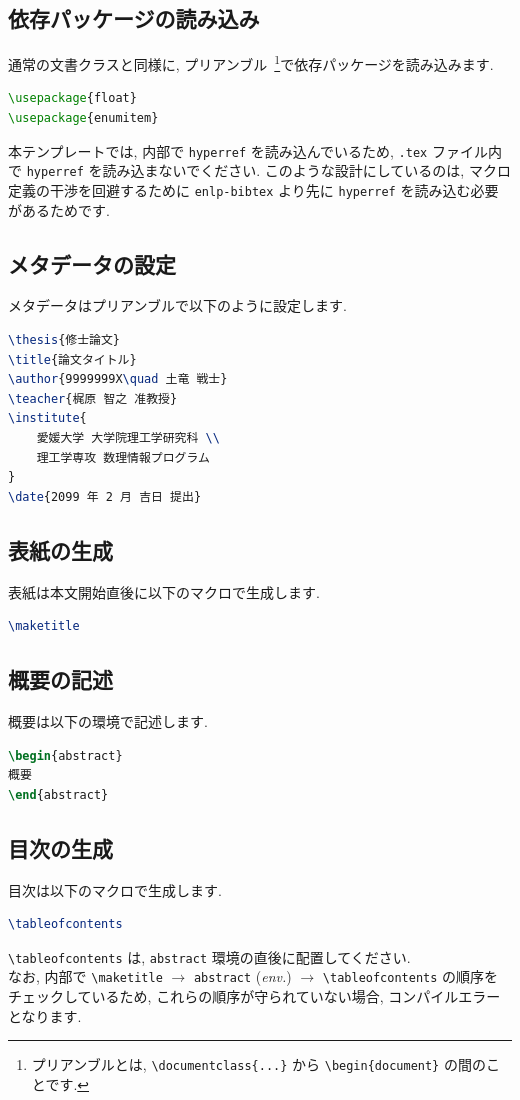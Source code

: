 \documentclass{ltjsarticle}
\newcommand{\pkg}[1]{\texttt{#1}}
\newcommand{\cs}[1]{\texttt{\textbackslash#1}}
\begin{document}
\subsection{依存パッケージの読み込み}
通常の文書クラスと同様に, プリアンブル~\footnote{プリアンブルとは, \cs{documentclass\{...\}} から \cs{begin\{document\}} の間のことです.}で依存パッケージを読み込みます. 
\begin{lstlisting}[language=TeX]
% 依存パッケージの例
\usepackage{float}
\usepackage{enumitem}
\end{lstlisting}
\begin{warning}
本テンプレートでは, 内部で \pkg{hyperref} を読み込んでいるため, \texttt{.tex} ファイル内で \pkg{hyperref} を読み込まないでください. 
このような設計にしているのは, マクロ定義の干渉を回避するために \pkg{enlp-bibtex} より先に \pkg{hyperref} を読み込む必要があるためです.
\end{warning}
\subsection{メタデータの設定}
メタデータはプリアンブルで以下のように設定します.
\begin{lstlisting}[language=TeX]
\thesis{修士論文}
\title{論文タイトル}
\author{9999999X\quad 土竜 戦士}
\teacher{梶原 智之 准教授}
\institute{
    愛媛大学 大学院理工学研究科 \\
    理工学専攻 数理情報プログラム
}
\date{2099 年 2 月 吉日 提出}
\end{lstlisting}
\subsection{表紙の生成}
表紙は本文開始直後に以下のマクロで生成します.
\begin{lstlisting}[language=TeX]
\maketitle
\end{lstlisting}
\subsection{概要の記述}
概要は以下の環境で記述します.
\begin{lstlisting}[language=TeX]
\begin{abstract}
概要
\end{abstract}
\end{lstlisting}
\subsection{目次の生成}
目次は以下のマクロで生成します.
\begin{lstlisting}[language=TeX]
\tableofcontents
\end{lstlisting}
\begin{warning}
\cs{tableofcontents} は, \texttt{abstract} 環境の直後に配置してください. \\
なお, 内部で \cs{maketitle} $\to$ \texttt{abstract} (\textit{env.}) $\to$ \cs{tableofcontents} の順序をチェックしているため, これらの順序が守られていない場合, コンパイルエラーとなります.
\end{warning}
\end{document}
